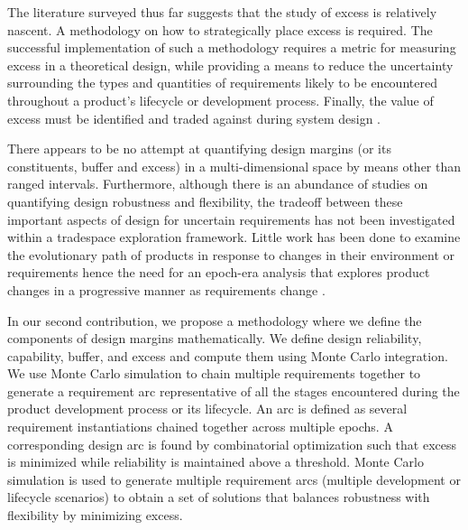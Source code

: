 
The literature surveyed thus far suggests that the study of excess is relatively nascent. A methodology on how to strategically place excess is required. The successful implementation of such a methodology requires a metric for measuring excess in a theoretical design, while providing a means to reduce the uncertainty surrounding the types and quantities of requirements likely to be encountered throughout a product's lifecycle or development process. Finally, the value of excess must be identified and traded against during system design \cite{Long2017}.

There appears to be no attempt at quantifying design margins (or its constituents, buffer and excess) in a multi-dimensional space by means other than ranged intervals. Furthermore, although there is an abundance of studies on quantifying design robustness and flexibility, the tradeoff between these important aspects of design for uncertain requirements has not been investigated within a tradespace exploration framework. Little work has been done to examine the evolutionary path of products in response to changes in their environment or requirements hence the need for an epoch-era analysis that explores product changes in a progressive manner as requirements change \cite{Long2017,Cardin2017}. 

In our second contribution, we propose a methodology where we define the components of design margins mathematically. We define design reliability, capability, buffer, and excess and compute them using Monte Carlo integration. We use Monte Carlo simulation to chain multiple requirements together to generate a requirement arc representative of all the stages encountered during the product development process or its lifecycle. An arc is defined as several requirement instantiations chained together across multiple epochs. A corresponding design arc is found by combinatorial optimization such that excess is minimized while reliability is maintained above a threshold. Monte Carlo simulation is used to generate multiple requirement arcs (multiple development or lifecycle scenarios) to obtain a set of solutions that balances robustness with flexibility by minimizing excess.

